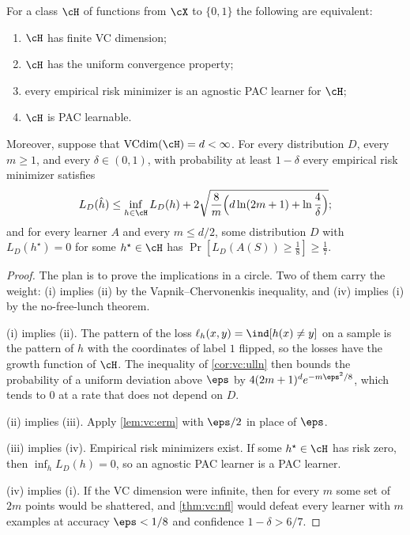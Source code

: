 \begin{refsection}
\begin{theorem}\label{thm:vc:fundamental}
For a class $\cH$ of functions from $\cX$ to $\{0,1\}$ the following are equivalent:
\begin{enumerate}
\item $\cH$ has finite VC dimension;
\item $\cH$ has the uniform convergence property;
\item every empirical risk minimizer is an agnostic PAC learner for $\cH$;
\item $\cH$ is PAC learnable.
\end{enumerate}
Moreover, suppose that $\vcdim(\cH) = d<\infty$. For every distribution $D$, every $m\ge1$, and every $\delta\in(0,1)$, with probability at least $1-\delta$ every empirical risk minimizer satisfies
\begin{equation}\label{eq:vc:erm}
  L_D(\hat h)\le\inf_{h\in\cH}L_D(h)+2\sqrt{\frac8m\Big(d\ln(2m+1)+\ln\frac4\delta\Big)} ;
\end{equation}
and for every learner $A$ and every $m\le d/2$, some distribution $D$ with $L_D(h^\star) = 0$ for some $h^\star\in\cH$ has $\Pr[L_D(A(S))\ge\frac18]\ge\frac17$.
\end{theorem}

\begin{proof}
The plan is to prove the implications in a circle. Two of them carry the weight: (i) implies (ii) by the Vapnik--Chervonenkis inequality, and (iv) implies (i) by the no-free-lunch theorem.

(i) implies (ii). The pattern of the loss $\ell_h(x,y) = \ind[h(x)\ne y]$ on a sample is the pattern of $h$ with the coordinates of label $1$ flipped, so the losses have the growth function of $\cH$. The inequality of \cref{cor:vc:ulln} then bounds the probability of a uniform deviation above $\eps$ by $4(2m+1)^de^{-m\eps^2/8}$, which tends to $0$ at a rate that does not depend on $D$.

(ii) implies (iii). Apply \cref{lem:vc:erm} with $\eps/2$ in place of $\eps$.

(iii) implies (iv). Empirical risk minimizers exist. If some $h^\star\in\cH$ has risk zero, then $\inf_hL_D(h) = 0$, so an agnostic PAC learner is a PAC learner.

(iv) implies (i). If the VC dimension were infinite, then for every $m$ some set of $2m$ points would be shattered, and \cref{thm:vc:nfl} would defeat every learner with $m$ examples at accuracy $\eps<1/8$ and confidence $1-\delta>6/7$.


\end{proof}
\end{refsection}
